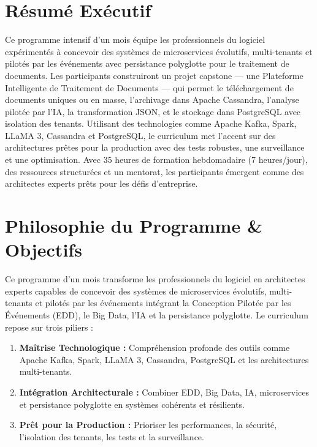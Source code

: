 \documentclass[11pt]{article}
\begin{document}
\section*{Résumé Exécutif}
Ce programme intensif d'un mois équipe les professionnels du logiciel expérimentés à concevoir des systèmes de microservices évolutifs, multi-tenants et pilotés par les événements avec persistance polyglotte pour le traitement de documents. Les participants construiront un projet capstone — une Plateforme Intelligente de Traitement de Documents — qui permet le téléchargement de documents uniques ou en masse, l'archivage dans Apache Cassandra, l'analyse pilotée par l'IA, la transformation JSON, et le stockage dans PostgreSQL avec isolation des tenants. Utilisant des technologies comme Apache Kafka, Spark, LLaMA 3, Cassandra et PostgreSQL, le curriculum met l'accent sur des architectures prêtes pour la production avec des tests robustes, une surveillance et une optimisation. Avec 35 heures de formation hebdomadaire (7 heures/jour), des ressources structurées et un mentorat, les participants émergent comme des architectes experts prêts pour les défis d'entreprise.

\tableofcontents
\newpage

\section{Philosophie du Programme \& Objectifs}
Ce programme d'un mois transforme les professionnels du logiciel en architectes experts capables de concevoir des systèmes de microservices évolutifs, multi-tenants et pilotés par les événements intégrant la Conception Pilotée par les Événements (EDD), le Big Data, l'IA et la persistance polyglotte. Le curriculum repose sur trois piliers :
\begin{enumerate}
    \item \textbf{Maîtrise Technologique :} Compréhension profonde des outils comme Apache Kafka, Spark, LLaMA 3, Cassandra, PostgreSQL et les architectures multi-tenants.
    \item \textbf{Intégration Architecturale :} Combiner EDD, Big Data, IA, microservices et persistance polyglotte en systèmes cohérents et résilients.
    \item \textbf{Prêt pour la Production :} Prioriser les performances, la sécurité, l'isolation des tenants, les tests et la surveillance.
\end{enumerate}
\end{document}
